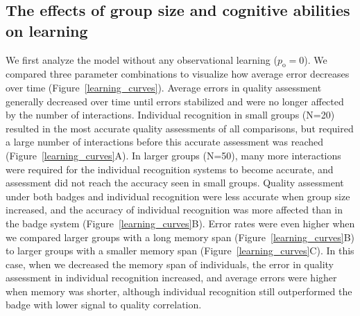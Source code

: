 \subsection*{The effects of group size and cognitive abilities on learning }
We first analyze the model without any observational learning ($p_\text{o}=0$). We compared three parameter combinations to visualize how average error decreases over time (Figure~\ref{learning_curves}). Average errors in quality assessment generally decreased over time until errors stabilized and were no longer affected by the number of interactions. 
Individual recognition in small groups (N=20) resulted in the most accurate quality assessments of all comparisons, but required a large number of interactions before this accurate assessment was reached (Figure~\ref{learning_curves}A). In larger groups (N=50), many more interactions were required for the individual recognition systems to become accurate, and assessment did not reach the accuracy seen in small groups. Quality assessment under both badges and individual recognition were less accurate when group size increased, and the accuracy of individual recognition was more affected than in the badge system (Figure~\ref{learning_curves}B). Error rates were even higher when we compared larger groups with a long memory span (Figure~\ref{learning_curves}B) to larger groups with a smaller memory span (Figure~\ref{learning_curves}C). In this case, when we decreased the memory span of individuals, the error in quality assessment in individual recognition increased, and average errors were higher when memory was shorter, although individual recognition still outperformed the badge with lower signal to quality correlation. 

